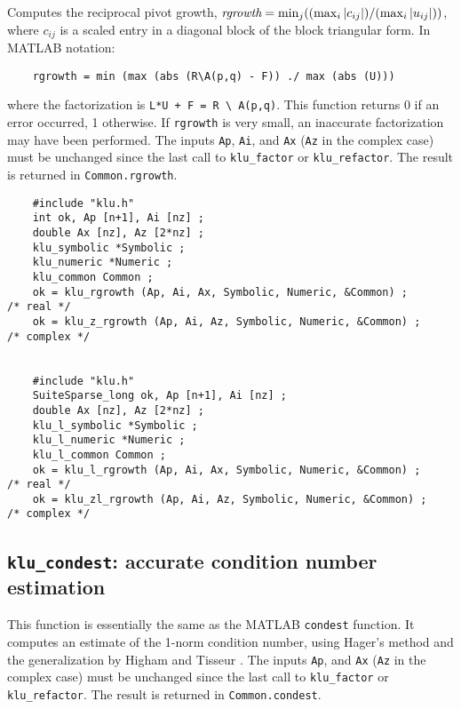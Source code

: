 \documentclass[11pt]{article}
\begin{document}
Computes the reciprocal pivot growth,
$\mbox{\em rgrowth} = \min_j (( \max_i |c_{ij}| ) / ( \max_i |u_{ij}| ))$,
where $c_{ij}$ is a scaled entry in a diagonal block of the block triangular
form.  In MATLAB notation:
\begin{verbatim}
    rgrowth = min (max (abs (R\A(p,q) - F)) ./ max (abs (U)))
\end{verbatim}
where the factorization is \verb'L*U + F = R \ A(p,q)'.
This function returns 0 if an error occurred, 1 otherwise.  If {\tt rgrowth} is
very small, an inaccurate factorization may have been performed.  The inputs
{\tt Ap}, {\tt Ai}, and {\tt Ax}  ({\tt Az} in the complex case) must be
unchanged since the last call to {\tt klu\_factor} or {\tt klu\_refactor}.  The
result is returned in {\tt Common.rgrowth}.

{\footnotesize
\begin{verbatim}
    #include "klu.h"
    int ok, Ap [n+1], Ai [nz] ;
    double Ax [nz], Az [2*nz] ;
    klu_symbolic *Symbolic ;
    klu_numeric *Numeric ;
    klu_common Common ;
    ok = klu_rgrowth (Ap, Ai, Ax, Symbolic, Numeric, &Common) ;                       /* real */
    ok = klu_z_rgrowth (Ap, Ai, Az, Symbolic, Numeric, &Common) ;                     /* complex */


    #include "klu.h"
    SuiteSparse_long ok, Ap [n+1], Ai [nz] ;
    double Ax [nz], Az [2*nz] ;
    klu_l_symbolic *Symbolic ;
    klu_l_numeric *Numeric ;
    klu_l_common Common ;
    ok = klu_l_rgrowth (Ap, Ai, Ax, Symbolic, Numeric, &Common) ;                     /* real */
    ok = klu_zl_rgrowth (Ap, Ai, Az, Symbolic, Numeric, &Common) ;                    /* complex */
\end{verbatim}
}

\subsection{{\tt klu\_condest}: accurate condition number estimation}

This function is essentially the same as the MATLAB {\tt condest} function.  It
computes an estimate of the 1-norm condition number, using Hager's method
\cite{Hager84} and the generalization by Higham and Tisseur
\cite{HighamTisseur00}.  The inputs {\tt Ap}, and {\tt Ax} ({\tt Az} in the
complex case) must be unchanged since the last call to {\tt klu\_factor} or
{\tt klu\_refactor}.  The result is returned in {\tt Common.condest}.
\end{document}
